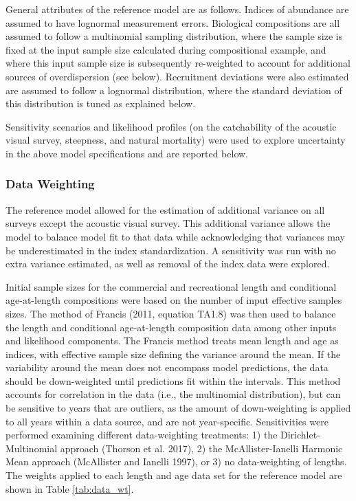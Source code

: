 \documentclass[11pt,
  letterpaper,
]{article}
\begin{document}
General attributes of the reference model are as follows. Indices of abundance are assumed to have lognormal measurement errors. Biological compositions are all assumed to follow a multinomial sampling distribution, where the sample size is fixed at the input sample size calculated during compositional example, and where this input sample size is subsequently re-weighted to account for additional sources of overdispersion (see below). Recruitment deviations were also estimated are assumed to follow a lognormal distribution, where the standard deviation of this distribution is tuned as explained below.

Sensitivity scenarios and likelihood profiles (on the catchability of the acoustic visual survey, steepness, and natural mortality) were used to explore uncertainty in the above model specifications and are reported below.

\hypertarget{data-weighting}{%
\subsubsection{Data Weighting}\label{data-weighting}}

The reference model allowed for the estimation of additional variance on all surveys except the acoustic visual survey. This additional variance allows the model to balance model fit to that data while acknowledging that variances may be underestimated in the index standardization. A sensitivity was run with no extra variance estimated, as well as removal of the index data were explored.

Initial sample sizes for the commercial and recreational length and conditional age-at-length compositions were based on the number of input effective samples sizes. The method of Francis (2011, equation TA1.8) was then used to balance the length and conditional age-at-length composition data among other inputs and likelihood components. The Francis method treats mean length and age as indices, with effective sample size defining the variance around the mean. If the variability around the mean does not encompass model predictions, the data should be down-weighted until predictions fit within the intervals. This method accounts for correlation in the data (i.e., the multinomial distribution), but can be sensitive to years that are outliers, as the amount of down-weighting is applied to all years within a data source, and are not year-specific. Sensitivities were performed examining different data-weighting treatments: 1) the Dirichlet-Multinomial approach (Thorson et al. 2017), 2) the McAllister-Ianelli Harmonic Mean approach (McAllister and Ianelli 1997), or 3) no data-weighting of lengths. The weights applied to each length and age data set for the reference model are shown in Table \ref{tab:data_wt}.
\end{document}

